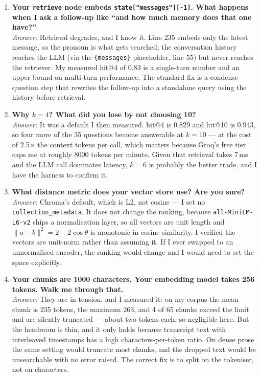 \documentclass[11pt,a4paper]{article}
\begin{document}
\begin{enumerate}[leftmargin=*,itemsep=6pt]

\item \textbf{Your \texttt{retrieve} node embeds \texttt{state["messages"][-1]}.
What happens when I ask a follow-up like ``and how much memory does that one
have?''}\\
\emph{Answer:} Retrieval degrades, and I know it. Line 235 embeds only the latest
message, so the pronoun is what gets searched; the conversation history reaches the
LLM (via the \texttt{\{messages\}} placeholder, line 55) but never reaches the
retriever. My measured hit@4 of 0.83 is a single-turn number and an upper bound on
multi-turn performance. The standard fix is a condense-question step that rewrites
the follow-up into a standalone query using the history before retrieval.

\item \textbf{Why $k=4$? What did you lose by not choosing 10?}\\
\emph{Answer:} It was a default I then measured. hit@4 is 0.829 and hit@10 is
0.943, so four more of the 35 questions become answerable at $k=10$ --- at the
cost of 2.5$\times$ the context tokens per call, which matters because Groq's free
tier caps me at roughly 8000 tokens per minute. Given that retrieval takes 7\,ms
and the LLM call dominates latency, $k=6$ is probably the better trade, and I have
the harness to confirm it.

\item \textbf{What distance metric does your vector store use? Are you sure?}\\
\emph{Answer:} Chroma's default, which is L2, not cosine --- I set no
\texttt{collection\_metadata}. It does not change the ranking, because
\texttt{all-MiniLM-L6-v2} ships a normalisation layer, so all vectors are unit
length and $\lVert a-b\rVert^2 = 2-2\cos\theta$ is monotonic in cosine
similarity. I verified the vectors are unit-norm rather than assuming it. If I
ever swapped to an unnormalised encoder, the ranking would change and I would need
to set the space explicitly.

\item \textbf{Your chunks are 1000 characters. Your embedding model takes 256
tokens. Walk me through that.}\\
\emph{Answer:} They are in tension, and I measured it: on my corpus the mean chunk
is 235 tokens, the maximum 263, and 4 of 65 chunks exceed the limit and are
silently truncated --- about two tokens each, so negligible here. But the headroom
is thin, and it only holds because transcript text with interleaved timestamps has
a high characters-per-token ratio. On dense prose the same setting would truncate
most chunks, and the dropped text would be unsearchable with no error raised. The
correct fix is to split on the tokeniser, not on characters.


\end{enumerate}
\end{document}
